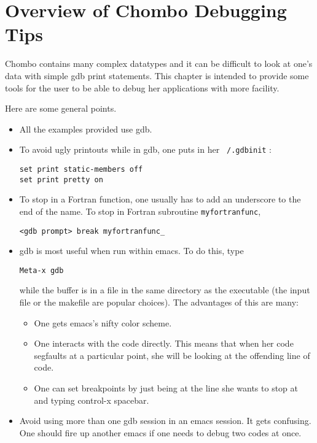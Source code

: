 \section{Overview of Chombo Debugging Tips}

Chombo contains many complex datatypes and it can be
difficult to look at one's data with simple gdb print 
statements.   This chapter is intended to provide some
tools for the user to be able to debug her applications 
with more facility.  

Here are some general points.
\begin{itemize}
\item All the examples provided use gdb.    
\item To avoid ugly printouts while in gdb, one puts in her
{\tt \string~/.gdbinit} :
\begin{verbatim}
set print static-members off
set print pretty on
\end{verbatim}

\item To stop in a Fortran function, one usually has to add an 
      underscore to the end of the name. To stop in Fortran subroutine
      {\tt myfortranfunc},
\begin{verbatim}
<gdb prompt> break myfortranfunc_
\end{verbatim}

\item gdb  is most useful when run within emacs.  To do this, type 
\begin{verbatim}
Meta-x gdb
\end{verbatim}
while the buffer is in a file in the same directory as the executable
(the input file or the makefile are popular choices).  The advantages
of this are many:
\begin{itemize}
  \item One gets emacs's nifty color scheme.
  \item One interacts with the code directly.  This means that when
       her code segfaults at a particular point,  she will be 
       looking at the offending line of code.
  \item One can set breakpoints by just being at the line she
       wants to stop at and typing  control-x spacebar.
\end{itemize}

\item Avoid using more than one gdb session in an emacs session.
     It gets confusing.  One should fire up another emacs if one needs
     to debug  two codes at once.


\end{itemize}
